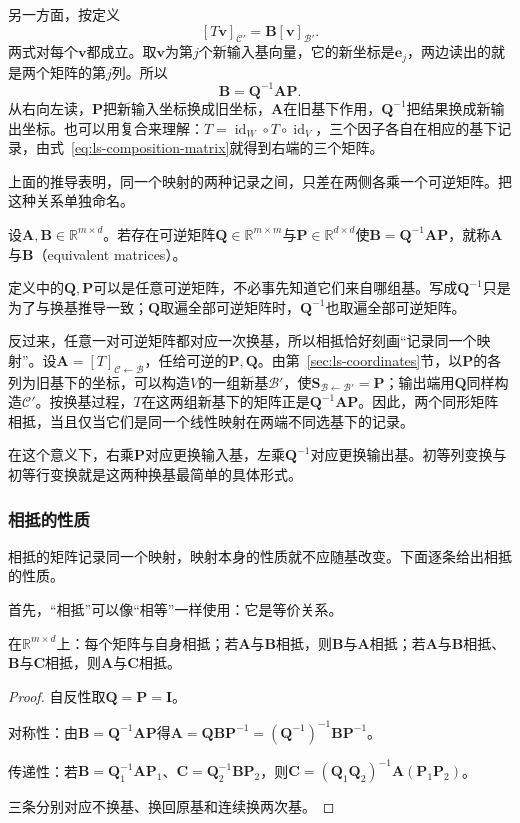另一方面，按定义
\[
 [T\bm v]_{\mathcal C'}=\bm B[\bm v]_{\mathcal B'} .
\]
两式对每个$\bm v$都成立。取$\bm v$为第$j$个新输入基向量，它的新坐标是$\bm e_j$，两边读出的就是两个矩阵的第$j$列。所以
\begin{equation}
 \bm B=\bm Q^{-1}\bm A\bm P.
 \label{eq:ls-equivalence-transform}
\end{equation}
从右向左读，$\bm P$把新输入坐标换成旧坐标，$\bm A$在旧基下作用，$\bm Q^{-1}$把结果换成新输出坐标。也可以用复合来理解：$T=\operatorname{id}_W\circ T\circ\operatorname{id}_V$，三个因子各自在相应的基下记录，由式~\eqref{eq:ls-composition-matrix}就得到右端的三个矩阵。

\label{sec:ls-equivalence-meaning}%
上面的推导表明，同一个映射的两种记录之间，只差在两侧各乘一个可逆矩阵。把这种关系单独命名。
\begin{definition}[矩阵相抵]
\label{def:ls-matrix-equivalence}
设$\bm A,\bm B\in\mathbb R^{m\times d}$。若存在可逆矩阵$\bm Q\in\mathbb R^{m\times m}$与$\bm P\in\mathbb R^{d\times d}$使$\bm B=\bm Q^{-1}\bm A\bm P$，就称$\bm A$与$\bm B$（equivalent matrices）。
\end{definition}
定义中的$\bm Q,\bm P$可以是任意可逆矩阵，不必事先知道它们来自哪组基。写成$\bm Q^{-1}$只是为了与换基推导一致；$\bm Q$取遍全部可逆矩阵时，$\bm Q^{-1}$也取遍全部可逆矩阵。

反过来，任意一对可逆矩阵都对应一次换基，所以相抵恰好刻画“记录同一个映射”。设$\bm A=[T]_{\mathcal C\leftarrow\mathcal B}$，任给可逆的$\bm P,\bm Q$。由第~\ref{sec:ls-coordinates}节，以$\bm P$的各列为旧基下的坐标，可以构造$V$的一组新基$\mathcal B'$，使$\bm S_{\mathcal B\leftarrow\mathcal B'}=\bm P$；输出端用$\bm Q$同样构造$\mathcal C'$。按换基过程，$T$在这两组新基下的矩阵正是$\bm Q^{-1}\bm A\bm P$。因此，两个同形矩阵相抵，当且仅当它们是同一个线性映射在两端不同选基下的记录。

在这个意义下，右乘$\bm P$对应更换输入基，左乘$\bm Q^{-1}$对应更换输出基。初等列变换与初等行变换就是这两种换基最简单的具体形式。

\subsubsection{相抵的性质}
\label{sec:ls-equivalence-properties}
相抵的矩阵记录同一个映射，映射本身的性质就不应随基改变。下面逐条给出相抵的性质。

首先，“相抵”可以像“相等”一样使用：它是等价关系。
\begin{theorem}[相抵是等价关系]
\label{thm:ls-equivalence-relation}
在$\mathbb R^{m\times d}$上：每个矩阵与自身相抵；若$\bm A$与$\bm B$相抵，则$\bm B$与$\bm A$相抵；若$\bm A$与$\bm B$相抵、$\bm B$与$\bm C$相抵，则$\bm A$与$\bm C$相抵。
\end{theorem}
\begin{proof}
自反性取$\bm Q=\bm P=\bm I$。

对称性：由$\bm B=\bm Q^{-1}\bm A\bm P$得$\bm A=\bm Q\bm B\bm P^{-1}=(\bm Q^{-1})^{-1}\bm B\bm P^{-1}$。

传递性：若$\bm B=\bm Q_1^{-1}\bm A\bm P_1$、$\bm C=\bm Q_2^{-1}\bm B\bm P_2$，则$\bm C=(\bm Q_1\bm Q_2)^{-1}\bm A(\bm P_1\bm P_2)$。

三条分别对应不换基、换回原基和连续换两次基。
\end{proof}

